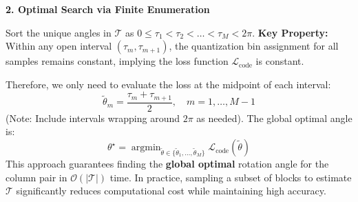 \textbf{2. Optimal Search via Finite Enumeration}

Sort the unique angles in $\mathcal{T}$ as $0 \le \tau_1 < \tau_2 < \dots < \tau_M < 2\pi$.
\textbf{Key Property:} Within any open interval $(\tau_m, \tau_{m+1})$, the quantization bin assignment for all samples remains constant, implying the loss function $\mathcal{L}_{\text{code}}$ is constant.

Therefore, we only need to evaluate the loss at the midpoint of each interval:
\begin{equation}
\tilde{\theta}_m = \frac{\tau_m + \tau_{m+1}}{2}, \quad m=1, \dots, M-1
\end{equation}
(Note: Include intervals wrapping around $2\pi$ as needed). The global optimal angle is:
\begin{equation}
\theta^\star = \mathop{\arg\min}_{\tilde{\theta} \in \{\tilde{\theta}_1, \dots, \tilde{\theta}_M\}} \mathcal{L}_{\text{code}}(\tilde{\theta})
\end{equation}
This approach guarantees finding the \textbf{global optimal} rotation angle for the column pair in $\mathcal{O}(|\mathcal{T}|)$ time. In practice, sampling a subset of blocks to estimate $\mathcal{T}$ significantly reduces computational cost while maintaining high accuracy.